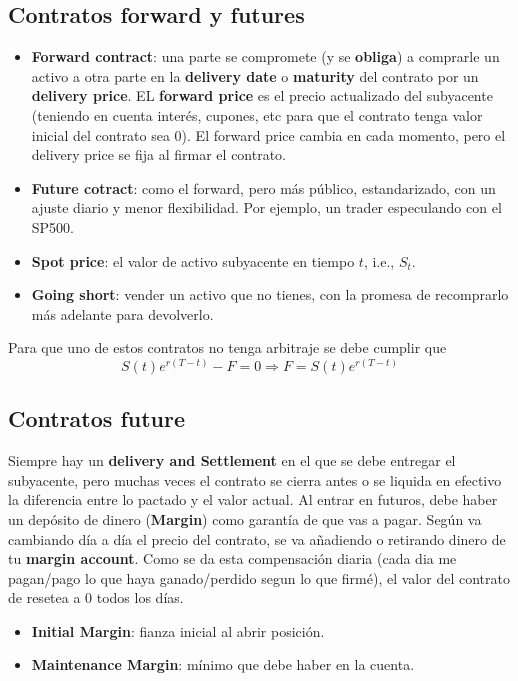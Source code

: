 \subsection{Contratos forward y futures}
\begin{itemize}
    \item \textbf{Forward contract}: una parte se compromete (y se \textbf{obliga}) a comprarle un activo a otra parte en la \textbf{delivery date} o \textbf{maturity} del contrato por un \textbf{delivery price}. EL \textbf{forward price} es el precio actualizado del subyacente (teniendo en cuenta interés, cupones, etc para que el contrato tenga valor inicial del contrato sea 0). El forward price cambia en cada momento, pero el delivery price se fija al firmar el contrato.
    \item \textbf{Future cotract}: como el forward, pero más público, estandarizado, con un ajuste diario y menor flexibilidad. Por ejemplo, un trader especulando con el SP500.
    \item \textbf{Spot price}: el valor de activo subyacente en tiempo $t$, i.e., $S_t$.
    \item \textbf{Going short}: vender un activo que no tienes, con la promesa de recomprarlo más adelante para devolverlo.
\end{itemize}
Para que uno de estos contratos no tenga arbitraje se debe cumplir que
\[S(t)e^{r(T-t)}-F=0 \Rightarrow F=S(t)e^{r(T-t)}\]



\subsection{Contratos future}
Siempre hay un \textbf{delivery and Settlement} en el que se debe entregar el subyacente, pero muchas veces el contrato se cierra antes o se liquida en efectivo la diferencia entre lo pactado y el valor actual.
Al entrar en futuros, debe haber un depósito de dinero (\textbf{Margin}) como garantía de que vas a pagar. Según va cambiando día a día el precio del contrato, se va añadiendo o retirando dinero de tu \textbf{margin account}. Como se da esta compensación diaria (cada dia me pagan/pago lo que haya ganado/perdido segun lo que firmé), el valor del contrato de resetea a 0 todos los días.
\begin{itemize}
    \item \textbf{Initial Margin}: fianza inicial al abrir posición.
    \item \textbf{Maintenance Margin}: mínimo que debe haber en la cuenta.
\end{itemize}

